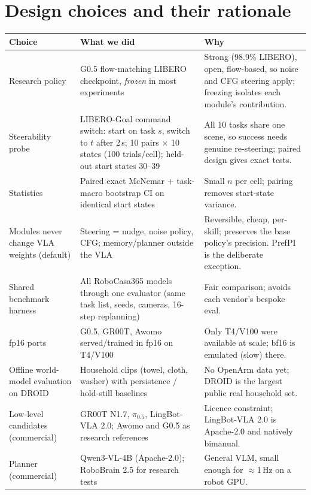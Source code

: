 \documentclass[10pt,a4paper]{article}
\newcommand{\pzf}{$\pi_{0.5}$}
\begin{document}
\section{Design choices and their rationale}
\label{sec:choices}
\begin{small}
\begin{longtable}{@{}P{3.6cm}P{5.4cm}P{6.6cm}@{}}
\toprule
\textbf{Choice} & \textbf{What we did} & \textbf{Why} \\
\midrule\endhead
Research policy & G0.5 flow-matching LIBERO checkpoint, \emph{frozen} in most experiments & Strong (98.9\% LIBERO), open, flow-based, so noise and CFG steering apply; freezing isolates each module's contribution. \\
Steerability probe & LIBERO-Goal command switch: start on task $s$, switch to $t$ after 2\,s; 10 pairs $\times$ 10 states (100 trials/cell); held-out start states 30--39 & All 10 tasks share one scene, so success needs genuine re-steering; paired design gives exact tests. \\
Statistics & Paired exact McNemar + task-macro bootstrap CI on identical start states & Small $n$ per cell; pairing removes start-state variance. \\
Modules never change VLA weights (default) & Steering = nudge, noise policy, CFG; memory/planner outside the VLA & Reversible, cheap, per-skill; preserves the base policy's precision. PrefPI is the deliberate exception. \\
Shared benchmark harness & All RoboCasa365 models through one evaluator (same task list, seeds, cameras, 16-step replanning) & Fair comparison; avoids each vendor's bespoke eval. \\
fp16 ports & G0.5, GR00T, Awomo served/trained in fp16 on T4/V100 & Only T4/V100 were available at scale; bf16 is emulated (slow) there. \\
Offline world-model evaluation on DROID & Household clips (towel, cloth, washer) with persistence / hold-still baselines & No OpenArm data yet; DROID is the largest public real household set. \\
Low-level candidates (commercial) & GR00T N1.7, \pzf, LingBot-VLA 2.0; Awomo and G0.5 as research references & Licence constraint; LingBot-VLA 2.0 is Apache-2.0 and natively bimanual. \\
Planner (commercial) & Qwen3-VL-4B (Apache-2.0); RoboBrain 2.5 for research tests & General VLM, small enough for $\approx$1\,Hz on a robot GPU. \\

\end{longtable}
\end{small}
\end{document}
